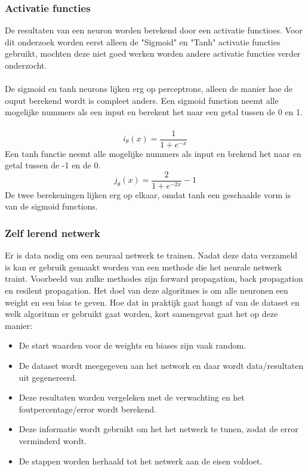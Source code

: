 \subsubsection{Activatie functies}
De resultaten van een neuron worden berekend door een activatie functioes. Voor dit onderzoek worden eerst alleen de "Sigmoid" en "Tanh" activatie functies gebruikt, mochten deze niet goed werken worden andere activatie functies verder onderzocht\cite{learning}. \\\\
De sigmoid en tanh neurons lijken erg op perceptrons, alleen de manier hoe de ouput berekend wordt is compleet anders. Een sigmoid function neemt alle mogelijke nummers als een input en berekent het naar een getal tussen de 0 en 1.\\\\
\begin{equation}
    i_ \theta (x) =  \frac{\mathrm{1} }{\mathrm{1} + e^{-x} }  \label{sigmoid}
  \end{equation}
Een tanh functie neemt alle mogelijke nummers als input en brekend het naar en getal tussen de -1 en de 0.\\
\begin{equation}
    j_ \theta (x) =  \frac{\mathrm{2} }{\mathrm{1} + e^{-2x} } -1 \label{tanh}
  \end{equation}
  \linebreak
  \noindent De twee berekeningen lijken erg op elkaar, omdat tanh een geschaalde vorm is van de sigmoid functions.

\subsubsection{Zelf lerend netwerk}
Er is data nodig om een neuraal netwerk te trainen. Nadat deze data verzameld is kan er gebruik gemaakt worden van een methode die het neurale netwerk traint. Voorbeeld van zulke methodes zijn forward propagation, back propagation en resilent propagation. Het doel van deze algoritmes is om alle neuronen een weight en een bias te geven. Hoe dat in praktijk gaat hangt af van de dataset en welk algoritmn er gebruikt gaat worden, kort samengevat gaat het op deze manier\cite{learning}:
\begin{itemize}
\item De start waarden voor de weights en biases zijn vaak random.
\item De dataset wordt meegegeven aan het network en daar wordt data/resultaten uit gegenereerd.
\item Deze resultaten worden vergeleken met de verwachting en het foutpercentage/error wordt berekend.
\item Deze informatie wordt gebruikt om het het netwerk te tunen, zodat de error verminderd wordt.
\item De stappen worden herhaald tot het netwerk aan de eisen voldoet.
\end{itemize}

